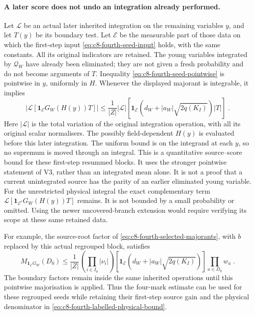 \documentclass[11pt]{article}
\begin{document}
\paragraph{A later score does not undo an integration already performed.}
Let $\mathcal L$ be an actual later inherited integration on the
remaining variables $y$, and let $T(y)$ be its boundary test.
Let $\mathscr E$ be the measurable part of those data on which the
first-step input \eqref{eq:c8-fourth-seed-input} holds, with the
same constants. All its original indicators are retained.
The young variables integrated by $\mathscr Q_W$ have already been
eliminated; they are not given a fresh probability and do not become
arguments of $T$. Inequality \eqref{eq:c8-fourth-seed-pointwise}
is pointwise in $y$, uniformly in $H$. Whenever the displayed
majorant is integrable, it implies
\begin{equation}\label{eq:c8-fourth-seed-score}
    |\mathcal L[\mathbf 1_{\mathscr E}G_W(H(y))T]|
        \leq\frac{1}{|Z|}|\mathcal L|\left[
            \mathbf 1_{\mathscr E}
            (d_W+|a_W|\sqrt{2q(K_I)})|T|\right]\;.
\end{equation}
Here $|\mathcal L|$ is the total variation of the original
integration operation, with all its original scalar normalisers.
The possibly field-dependent $H(y)$ is evaluated before this later
integration. The uniform bound is on the integrand at each $y$,
so no supremum is moved through an integral. This is a quantitative
source--score bound for these first-step resummed blocks. It uses
the stronger pointwise statement of V3, rather than an integrated
mean alone. It is not a proof that a current unintegrated source
has the parity of an earlier eliminated young variable.
For the unrestricted physical integral the exact complementary
term $\mathcal L[\mathbf 1_{\mathscr E^c}G_W(H(y))T]$ remains.
It is not bounded by a small probability or omitted. Using the
newer uncovered-branch extension would require verifying its
scope at these same retained data.

For example, the source-root factor of
\eqref{eq:c8-fourth-selected-majorants}, with $b$ replaced by this
actual regrouped block, satisfies
\begin{equation}\label{eq:c8-fourth-seed-in-majorant}
    M_{\mathbf 1_{\mathscr E}G_W}(D_0)
        \leq\frac{1}{|Z|}
            \left(\prod_{i\in I_0}|\nu_i|\right)
                [\mathbf 1_{\mathscr E}
                    (d_W+|a_W|\sqrt{2q(K_I)})]
            \prod_{a\in D_0}w_a\;.
\end{equation}
The boundary factors remain inside the same inherited operations
until this pointwise majorisation is applied. Thus the four-mark
estimate can be used for these regrouped seeds while retaining
their first-step source gain and the physical denominator in
\eqref{eq:c8-fourth-labelled-physical-bound}.
\end{document}
